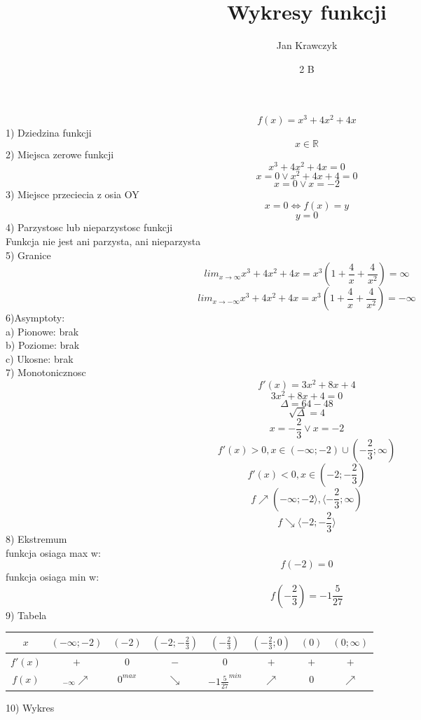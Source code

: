 \documentclass[12pt]{article}
\title{Wykresy funkcji}
\author{Jan Krawczyk}
\date{2 B}
\begin{document}
\maketitle
$$ f(x) = x^3 + 4 x^2 + 4 x $$
 1) Dziedzina  funkcji 
$$ x \in \mathbb{R}$$
2) Miejsca zerowe funkcji
$$ x^3 + 4x^2 + 4x = 0$$
$$ x = 0 \vee x^2 + 4x + 4 = 0$$
$$ x = 0 \vee x = -2$$
3) Miejsce przeciecia z osia OY
$$ x = 0 \Leftrightarrow f(x) = y$$
$$ y = 0$$
4) Parzystosc lub nieparzystosc funkcji \\
Funkcja nie jest ani parzysta, ani nieparzysta\\
5) Granice
$$ lim _{x\to\infty} x^3+4x^2+4x = x^3(1+\frac4x+\frac4{x^2}) = \infty$$
$$ lim _{x\to-\infty} x^3+4x^2+4x = x^3(1+\frac4x+\frac4{x^2}) = -\infty$$
6)Asymptoty:\\
a) Pionowe: brak \\
b) Poziome: brak \\
c) Ukosne: brak \\
7) Monotonicznosc
$$ f\prime(x) = 3x^2+8x+4$$
$$ 3x^2+8x+4 = 0$$
$$ \Delta = 64-48$$
$$ \sqrt \Delta = 4$$
$$ x = -\frac2 3 \vee x = -2$$
$$ f\prime(x) > 0, x \in (-\infty;-2) \cup (-\frac2 3; \infty)$$
$$ f\prime(x) < 0, x \in (-2; -\frac2 3)$$
$$ f \nearrow (-\infty; -2\rangle , \langle -\frac2 3; \infty) $$
$$ f \searrow  \langle -2; -\frac2 3 \rangle $$
8) Ekstremum \\
funkcja osiaga max w:
$$ f(-2) = 0$$
funkcja osiaga min w:
$$ f(- \frac2 3) = -1 \frac5 {27}$$
9) Tabela\\
\begin{center}
\begin{tabular}{ c | c | c | c | c | c | c | c}
 $x$ & $(-\infty;-2)$ & $(-2)$ & $(-2;-\frac2 3)$ & $(-\frac2 3)$ & $(-\frac2 3;0)$ & $(0)$ & $(0; \infty)$\\
 \hline
 $f\prime(x)$ & $+$ & $0$ & $-$ & $0$ & $+$ & $+$ &$+$\\
 \hline
 $f(x)$ & $_{-\infty}\nearrow$ & $0^{max}$ & $\searrow$ & $-1\frac5 {27}^{min}$ & $\nearrow$ & $0$ & $\nearrow$\\    
\end{tabular}
\end{center}
10) Wykres\\
\end{document}
